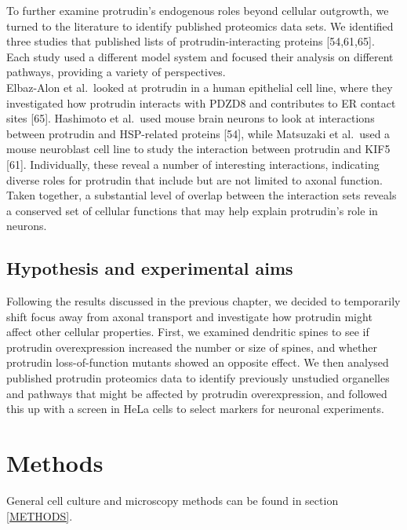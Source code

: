 \documentclass[
  12pt,
  a4paper,
]{book}
\begin{document}
To further examine protrudin's endogenous roles beyond cellular outgrowth, we turned to the literature to identify published proteomics data sets. We identified three studies that published lists of protrudin-interacting proteins {[}54,61,65{]}. Each study used a different model system and focused their analysis on different pathways, providing a variety of perspectives.\\
Elbaz-Alon et al.~looked at protrudin in a human epithelial cell line, where they investigated how protrudin interacts with PDZD8 and contributes to ER contact sites {[}65{]}. Hashimoto et al.~used mouse brain neurons to look at interactions between protrudin and HSP-related proteins {[}54{]}, while Matsuzaki et al.~used a mouse neuroblast cell line to study the interaction between protrudin and KIF5 {[}61{]}. Individually, these reveal a number of interesting interactions, indicating diverse roles for protrudin that include but are not limited to axonal function. Taken together, a substantial level of overlap between the interaction sets reveals a conserved set of cellular functions that may help explain protrudin's role in neurons.

\hypertarget{hypothesis-and-experimental-aims-1}{%
\subsection{Hypothesis and experimental aims}\label{hypothesis-and-experimental-aims-1}}

Following the results discussed in the previous chapter, we decided to temporarily shift focus away from axonal transport and investigate how protrudin might affect other cellular properties. First, we examined dendritic spines to see if protrudin overexpression increased the number or size of spines, and whether protrudin loss-of-function mutants showed an opposite effect. We then analysed published protrudin proteomics data to identify previously unstudied organelles and pathways that might be affected by protrudin overexpression, and followed this up with a screen in HeLa cells to select markers for neuronal experiments.

\hypertarget{methods-1}{%
\section{Methods}\label{methods-1}}

General cell culture and microscopy methods can be found in section \ref{METHODS}.
\end{document}
